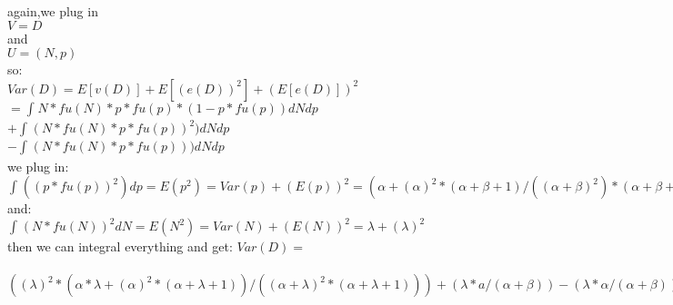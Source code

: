 \documentclass{amsart}
\begin{document}
\begin{enumerate}
again,we plug in \\$V = D $\\and \\$U = (N,p)$\\
so:\\
$Var(D)= E[v(D)] + E[(e(D))^2] + (E[e(D)])^2$\\
$=\int_{}^{} N *fu(N) * p * fu(p) * (1 - p * fu(p))dNdp$\\
$+\int_{}^{} (N *fu(N) * p * fu(p))^2 )dNdp$\\
$-\int_{}^{} (N *fu(N) * p * fu(p)) )dNdp$\\
we plug in:\\
$\int_{}^{}((p*fu(p))^2)dp = E(p^2) = Var(p) + (E(p))^2 = (\alpha+(\alpha)^2*(\alpha+\beta+1)/((\alpha+\beta)^2)*(\alpha+\beta+1))$\\
and:\\
$\int_{}^{}(N*fu(N))^2dN = E(N^2)=Var(N)+(E(N))^2=\lambda + (\lambda)^2$\\
then we can integral everything and get:
$Var(D)= $\\
\\$((\lambda)^2*(\alpha*\lambda+(\alpha)^2*(\alpha+\lambda+1))/((\alpha+\lambda)^2*(\alpha+\lambda+1)))+(\lambda*a/(\alpha+\beta))-(\lambda*\alpha/(\alpha+\beta))$\\

\end{enumerate}
\end{document}
